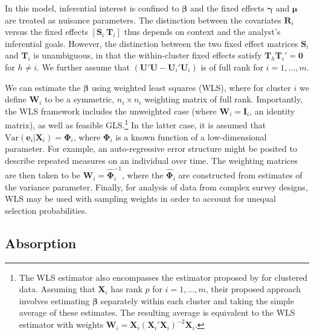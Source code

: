 \documentclass[12pt]{article}\usepackage[]{graphicx}\usepackage[]{color}
\newcommand{\Var}{\text{Var}}
\newcommand{\bm}{\mathbf}
\newcommand{\bs}{\boldsymbol}
\begin{document}
In this model, inferential interest is confined to $\bs\beta$ and the fixed effects $\bs\gamma$ and $\bs\mu$ are treated as nuisance parameters. The distinction between the covariates $\bm{R}_i$ versus the fixed effects $\left[\bm{S}_i \ \bm{T}_i\right]$ thus depends on context and the analyst's inferential goals. However, the distinction between the two fixed effect matrices $\bm{S}_i$ and $\bm{T}_i$ is unambiguous, in that the within-cluster fixed effects satisfy $\bm{T}_h \bm{T}_i' = \bm{0}$ for $h \neq i$. We further assume that $\left(\bm{U}'\bm{U} - \bm{U}_i'\bm{U}_i\right)$ is of full rank for $i = 1,...,m$.

We can estimate the $\bs\beta$ using weighted least squares (WLS), where for cluster $i$ we define $\bm{W}_i$ to be a symmetric, $n_i \times n_i$ weighting matrix of full rank. 
Importantly, the WLS framework includes the unweighted case (where $\bm{W}_i = \bm{I}_i$, an identity matrix), as well as feasible GLS.\footnote{
The WLS estimator also encompasses the estimator proposed by \citet{Ibragimov2010tstatistic} for clustered data. 
Assuming that $\bm{X}_i$ has rank $p$ for $i = 1,...,m$, their proposed approach involves estimating $\bs\beta$ separately within each cluster and taking the simple average of these estimates. 
The resulting average is equivalent to the WLS estimator with weights $\bm{W}_i = \bm{X}_i \left(\bm{X}_i'\bm{X}_i\right)^{-2} \bm{X}_i$.} 
In the latter case, it is assumed that $\Var\left(\bm{e}_i\left|\bm{X}_i\right.\right) = \bs\Phi_i$, where $\bs\Phi_i$ is a known function of a low-dimensional parameter. 
For example, an auto-regressive error structure might be posited to describe repeated measures on an individual over time. 
The weighting matrices are then taken to be $\bm{W}_i = \hat{\bs\Phi}_i^{-1}$, where the $\hat{\bs\Phi}_i$ are constructed from estimates of the variance parameter.
Finally, for analysis of data from complex survey designs, WLS may be used with sampling weights in order to account for unequal selection probabilities.

\subsection{Absorption}
\end{document}
